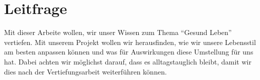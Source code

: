 \chapter{Leitfrage}
\authortoc{\dario}{\chapterident}
Mit dieser Arbeite wollen, wir unser Wissen zum Thema “Gesund Leben” vertiefen. 
\newline
Mit unserem Projekt wollen wir herausfinden, wie wir unsere Lebensstil am besten anpassen können und was für Auswirkungen diese Umstellung für uns hat.
\newline
Dabei achten wir möglichst darauf, dass es alltagstauglich bleibt, damit wir dies nach der Vertiefungsarbeit weiterführen können.